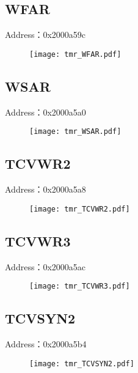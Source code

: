 \subsection{WFAR}
\label{tmr-WFAR}
Address：0x2000a59c
 \begin{figure}[H]
\texttt{[image: tmr\_WFAR.pdf]}
\end{figure}

\subsection{WSAR}
\label{tmr-WSAR}
Address：0x2000a5a0
 \begin{figure}[H]
\texttt{[image: tmr\_WSAR.pdf]}
\end{figure}

\subsection{TCVWR2}
\label{tmr-TCVWR2}
Address：0x2000a5a8
 \begin{figure}[H]
\texttt{[image: tmr\_TCVWR2.pdf]}
\end{figure}

\subsection{TCVWR3}
\label{tmr-TCVWR3}
Address：0x2000a5ac
 \begin{figure}[H]
\texttt{[image: tmr\_TCVWR3.pdf]}
\end{figure}

\subsection{TCVSYN2}
\label{tmr-TCVSYN2}
Address：0x2000a5b4
 \begin{figure}[H]
\texttt{[image: tmr\_TCVSYN2.pdf]}
\end{figure}

